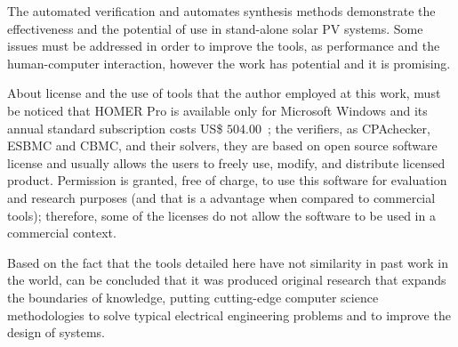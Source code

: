 The automated verification and automates synthesis methods demonstrate the effectiveness and the potential of use in stand-alone solar PV systems. Some issues must be addressed in order to improve the tools, as performance and the human-computer interaction, however the work has potential and it is promising.

About license and the use of tools that the author employed at this work, must be noticed that HOMER Pro is available only for Microsoft Windows and its annual standard subscription costs US\$ $504.00$~\cite{HOMER}; the verifiers, as CPAchecker, ESBMC and CBMC, and their solvers, they are  based on open source software license and usually allows the users to freely use, modify, and distribute licensed product. Permission is granted, free of charge, to use this software for evaluation and research purposes (and that is a advantage when compared to commercial tools); therefore, some of the licenses do not allow the software to be used in a commercial context.

Based on the fact that the tools detailed here have not similarity in past work in the world, can be concluded that it was produced original research that expands the boundaries of knowledge, putting cutting-edge computer science methodologies to solve typical electrical engineering problems and to improve the design of systems.



